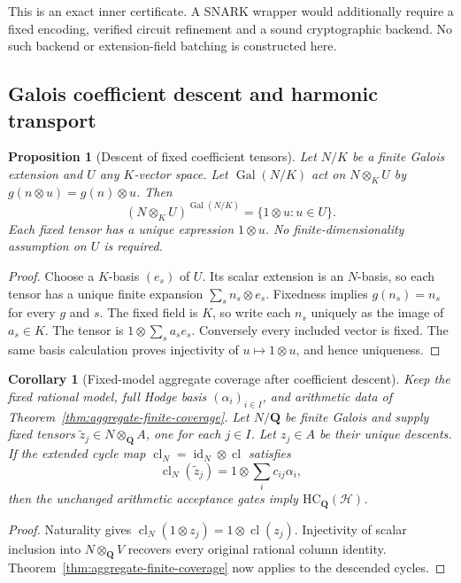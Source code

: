 \documentclass[11pt]{article}
\newtheorem{proposition}[theorem]{Proposition}
\newtheorem{corollary}[theorem]{Corollary}
\theoremstyle{definition}
\theoremstyle{remark}
\newcommand{\Q}{\mathbf Q}
\begin{document}
This is an exact inner certificate. A SNARK wrapper would additionally
require a fixed encoding, verified circuit refinement and a sound
cryptographic backend. No such backend or extension-field batching is
constructed here.

\subsection{Galois coefficient descent and harmonic transport}
\label{subsec:galois-harmonic-coverage}

\begin{proposition}[Descent of fixed coefficient tensors]
\label{prop:galois-coefficient-descent}
Let \(N/K\) be a finite Galois extension and \(U\) any \(K\)-vector space.
Let \(\operatorname{Gal}(N/K)\) act on \(N\otimes_K U\) by
\(g(n\otimes u)=g(n)\otimes u\). Then
\[
 (N\otimes_K U)^{\operatorname{Gal}(N/K)}
   =\{1\otimes u:u\in U\}.
\]
Each fixed tensor has a unique expression \(1\otimes u\).
No finite-dimensionality assumption on \(U\) is required.
\end{proposition}
\begin{proof}
Choose a \(K\)-basis \((e_s)\) of \(U\). Its scalar extension is an
\(N\)-basis, so each tensor has a unique finite expansion
\(\sum_s n_s\otimes e_s\). Fixedness implies \(g(n_s)=n_s\) for every
\(g\) and \(s\). The fixed field is \(K\), so write each \(n_s\) uniquely
as the image of \(a_s\in K\). The tensor is
\(1\otimes\sum_s a_s e_s\). Conversely every included vector is fixed.
The same basis calculation proves injectivity of \(u\mapsto1\otimes u\),
and hence uniqueness.
\end{proof}

\begin{corollary}[Fixed-model aggregate coverage after coefficient descent]
\label{cor:galois-aggregate-coverage}
Keep the fixed rational model, full Hodge basis \((\alpha_i)_{i\in I}\),
and arithmetic data of Theorem~\ref{thm:aggregate-finite-coverage}.
Let \(N/\Q\) be finite Galois and supply fixed tensors
\(\widetilde z_j\in N\otimes_{\Q}A\), one for each \(j\in I\).
Let \(z_j\in A\) be their unique descents. If the extended cycle map
\(\operatorname{cl}_N=\operatorname{id}_N\otimes\operatorname{cl}\) satisfies
\[
 \operatorname{cl}_N(\widetilde z_j)
   =1\otimes\sum_i c_{ij}\alpha_i,
\]
then the unchanged arithmetic acceptance gates imply
\(\mathrm{HC}_{\Q}(\mathscr H)\).
\end{corollary}
\begin{proof}
Naturality gives \(\operatorname{cl}_N(1\otimes z_j)
=1\otimes\operatorname{cl}(z_j)\). Injectivity of scalar inclusion into
\(N\otimes_{\Q}V\) recovers every original rational column identity.
Theorem~\ref{thm:aggregate-finite-coverage} now applies to the descended cycles.
\end{proof}
\end{document}
